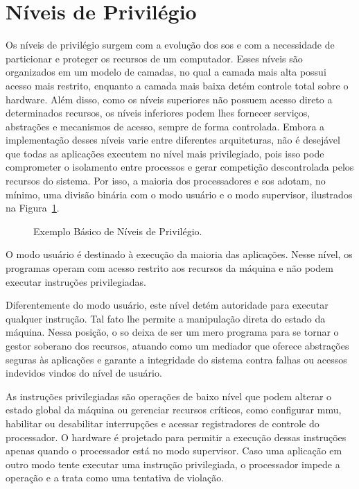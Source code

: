 \section{Níveis de Privilégio}

Os níveis de privilégio surgem com a evolução dos \glspl{so} e com a necessidade de particionar e proteger os recursos de um computador.
Esses níveis são organizados em um modelo de camadas, no qual a camada mais alta possui acesso mais restrito, enquanto a camada mais baixa detém controle total sobre o \gls{hardware}.
Além disso, como os níveis superiores não possuem acesso direto a determinados recursos, os níveis inferiores podem lhes fornecer serviços, abstrações e mecanismos de acesso, sempre de forma controlada.
Embora a implementação desses níveis varie entre diferentes arquiteturas, não é desejável que todas as aplicações executem no nível mais privilegiado, pois isso pode comprometer o isolamento
entre processos e gerar competição descontrolada pelos recursos do sistema.
Por isso, a maioria dos processadores e \glspl{so} adotam, no mínimo, uma divisão binária com o modo usuário e o modo supervisor, ilustrados na Figura~\ref{fig:niveis-privilegio}.

\begin{figure}[htbp]
    \centering
    \caption{Exemplo Básico de Níveis de Privilégio.}
    \label{fig:niveis-privilegio}
\end{figure}

O modo usuário é destinado à execução da maioria das aplicações. Nesse nível, os programas operam com acesso restrito aos recursos
da máquina e não podem executar instruções privilegiadas.

Diferentemente do modo usuário, este nível detém autoridade para executar qualquer instrução. Tal fato lhe permite a manipulação direta do
estado da máquina.
Nessa posição, o \gls{so} deixa de ser um mero programa para se tornar o gestor soberano dos recursos, atuando como um mediador que oferece
abstrações seguras às aplicações e garante a integridade do sistema contra falhas ou acessos indevidos vindos do nível de usuário.

As instruções privilegiadas são operações de baixo nível que podem alterar o estado global da máquina ou gerenciar recursos críticos, como
configurar \gls{mmu}, habilitar ou desabilitar interrupções e acessar registradores de controle do processador.
O hardware é projetado para permitir a execução dessas instruções apenas quando o processador está no modo supervisor. Caso uma aplicação
em outro modo tente executar uma instrução privilegiada, o processador impede a operação e a trata como uma tentativa de violação.




